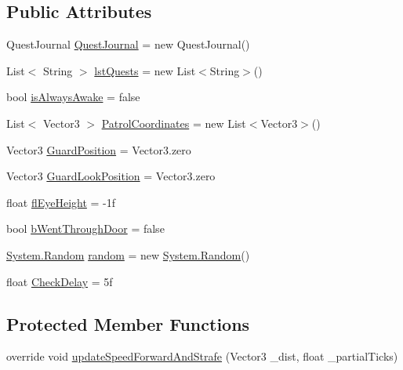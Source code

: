 \subsection*{Public Attributes}
\begin{DoxyCompactItemize}
\item 
Quest\+Journal \mbox{\hyperlink{class_entity_alive_s_d_x_a3dae6ce1241c45fae4a065788ee6ac4f}{Quest\+Journal}} = new Quest\+Journal()
\item 
List$<$ String $>$ \mbox{\hyperlink{class_entity_alive_s_d_x_a42eb949271504f317942f9d6c94f0871}{lst\+Quests}} = new List$<$String$>$()
\item 
bool \mbox{\hyperlink{class_entity_alive_s_d_x_adc7bfe742d0a4841d5c8cc0943026977}{is\+Always\+Awake}} = false
\item 
List$<$ Vector3 $>$ \mbox{\hyperlink{class_entity_alive_s_d_x_a0d943700c840fdf1128132467946bbcc}{Patrol\+Coordinates}} = new List$<$Vector3$>$()
\item 
Vector3 \mbox{\hyperlink{class_entity_alive_s_d_x_a7e6fe86e67d1e8e7b7fb308cae888e07}{Guard\+Position}} = Vector3.\+zero
\item 
Vector3 \mbox{\hyperlink{class_entity_alive_s_d_x_ab664e0ce5fd1280cc7eeb1dfe4d4bc3e}{Guard\+Look\+Position}} = Vector3.\+zero
\item 
float \mbox{\hyperlink{class_entity_alive_s_d_x_ac600417d5c1bd818a548275e5c067284}{fl\+Eye\+Height}} = -\/1f
\item 
bool \mbox{\hyperlink{class_entity_alive_s_d_x_a4a6cf8d5d3c046a55c407b865a5cb0cd}{b\+Went\+Through\+Door}} = false
\item 
\mbox{\hyperlink{_winter_mod_prefab_8cs_a24953b19d956caa76c403684c71b4e5b}{System.\+Random}} \mbox{\hyperlink{class_entity_alive_s_d_x_ac910de3329b46a5766ec914b8cefc10a}{random}} = new \mbox{\hyperlink{_winter_mod_prefab_8cs_a24953b19d956caa76c403684c71b4e5b}{System.\+Random}}()
\item 
float \mbox{\hyperlink{class_entity_alive_s_d_x_af77d637b90eb673e8455e2c8ccf969a0}{Check\+Delay}} = 5f
\end{DoxyCompactItemize}
\subsection*{Protected Member Functions}
\begin{DoxyCompactItemize}
\item 
override void \mbox{\hyperlink{class_entity_alive_s_d_x_a30f867945827de24011036ebcba224de}{update\+Speed\+Forward\+And\+Strafe}} (Vector3 \+\_\+dist, float \+\_\+partial\+Ticks)
\end{DoxyCompactItemize}
